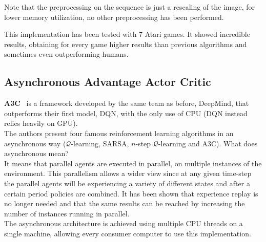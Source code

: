 Note that the preprocessing on the sequence is just a rescaling of the image, for lower memory utilization, no other preprocessing has been performed.

This implementation has been tested with 7 Atari games. It showed incredible results, obtaining for every game higher results than previous algorithms and sometimes even outperforming humans.

\subsection{Asynchronous Advantage Actor Critic}
\textbf{A3C}~\cite{a3c} is a framework developed by the same team as before, DeepMind, that outperforms their first model, DQN, with the only use of CPU (DQN instead relies heavily on GPU). \\
The authors present four famous reinforcement learning algorithms in an asynchronous way ($\mathcal{Q}$-learning, SARSA, $n$-step $\mathcal{Q}$-learning and A3C). What does asynchronous mean? \\
It means that parallel agents are executed in parallel, on multiple instances of the environment. This parallelism allows a wider view since at any given time-step the parallel agents will be experiencing a variety of different states and after a certain period policies are combined. It has been shown that experience replay is no longer needed and that the same results can be reached by increasing the number of instances running in parallel.\\
The asynchronous architecture is achieved using multiple CPU threads on a single machine, allowing every consumer computer to use this implementation.

